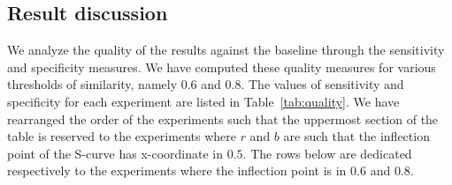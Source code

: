 \subsection{Result discussion}
We analyze the quality of the results against the baseline through the sensitivity and specificity measures. We have computed these quality measures for various thresholds of similarity, namely $0.6$ and $0.8$. The values of sensitivity and specificity for each experiment are listed in Table~\ref{tab:quality}. We have rearranged the order of the experiments such that the uppermost section of the table is reserved to the experiments where $r$ and $b$ are such that the inflection point of the S-curve has x-coordinate in $0.5$. The rows below are dedicated respectively to the experiments where the inflection point is in $0.6$ and $0.8$. 

